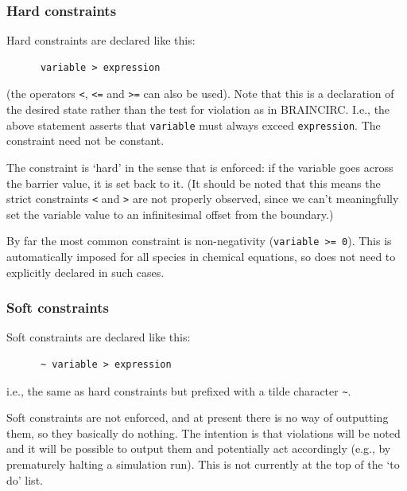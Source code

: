 \documentclass[a4paper,11pt]{article}
\begin{document}
\subsubsection{Hard constraints}\label{hard}
Hard constraints are declared like this:
\begin{verbatim}
      variable > expression
\end{verbatim}
(the operators \texttt{<}, \texttt{<=} and \texttt{>=} can also be used). Note that this is a declaration of the desired state rather than the test for violation as in BRAINCIRC. I.e., the above statement asserts that \texttt{variable} must always exceed \texttt{expression}. The constraint need not be constant.

The constraint is `hard' in the sense that is enforced: if the variable goes across the barrier value, it is set back to it. (It should be noted that this means the strict constraints \texttt{<} and \texttt{>} are not properly observed, since we can't meaningfully set the variable value to an infinitesimal offset from the boundary.)

By far the most common constraint is non-negativity (\texttt{variable >= 0}). This is automatically imposed for all species in chemical equations, so does not need to explicitly declared in such cases.

\subsubsection{Soft constraints}\label{soft}
Soft constraints are declared like this:
\begin{verbatim}
      ~ variable > expression
\end{verbatim}
i.e., the same as hard constraints but prefixed with a tilde character \texttt{\~}.

Soft constraints are not enforced, and at present there is no way of outputting them, so they basically do nothing. The intention is that violations will be noted and it will be possible to output them and potentially act accordingly (e.g., by prematurely halting a simulation run). This is not currently at the top of the `to do' list.
\end{document}
